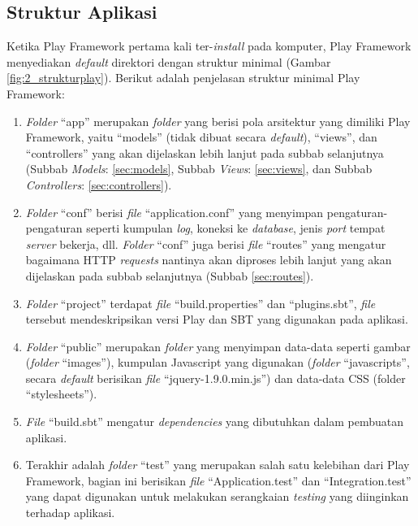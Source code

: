 \subsection{Struktur Aplikasi}
\label{sec:struktur_aplikasi}
Ketika Play Framework pertama kali ter-\textit{install} pada komputer, Play Framework menyediakan \textit{default} direktori dengan struktur minimal (Gambar \ref{fig:2_strukturplay}). Berikut adalah penjelasan struktur minimal Play Framework:
\begin{enumerate}
	\item \textit{Folder} ``app'' merupakan \textit{folder} yang berisi pola arsitektur yang dimiliki Play Framework, yaitu ``models'' (tidak dibuat secara \textit{default}), ``views'', dan ``controllers'' yang akan dijelaskan lebih lanjut pada subbab selanjutnya (Subbab \textit{Models}: \ref{sec:models}, Subbab \textit{Views}: \ref{sec:views}, dan Subbab \textit{Controllers}: \ref{sec:controllers}).
	\item \textit{Folder} ``conf'' berisi \textit{file} ``application.conf'' yang menyimpan pengaturan-pengaturan seperti kumpulan \textit{log}, koneksi ke \textit{database}, jenis \textit{port} tempat \textit{server} bekerja, dll. \textit{Folder} ``conf'' juga berisi \textit{file} ``routes'' yang mengatur bagaimana HTTP \textit{requests} nantinya akan diproses lebih lanjut yang akan dijelaskan pada subbab selanjutnya (Subbab \ref{sec:routes}).
	\item \textit{Folder} ``project'' terdapat \textit{file} ``build.properties'' dan ``plugins.sbt'', \textit{file} tersebut mendeskripsikan versi Play dan SBT yang digunakan pada aplikasi.
	\item \textit{Folder} ``public'' merupakan \textit{folder} yang menyimpan data-data seperti gambar (\textit{folder} ``images''), kumpulan Javascript yang digunakan (\textit{folder} ``javascripts'', secara \textit{default} berisikan \textit{file} ``jquery-1.9.0.min.js'') dan data-data CSS (folder ``stylesheets'').
	\item \textit{File} ``build.sbt'' mengatur \textit{dependencies} yang dibutuhkan dalam pembuatan aplikasi.
	\item Terakhir adalah \textit{folder} ``test'' yang merupakan salah satu kelebihan dari Play Framework, bagian ini berisikan \textit{file} ``Application.test'' dan ``Integration.test'' yang dapat digunakan untuk melakukan serangkaian \textit{testing} yang diinginkan terhadap aplikasi.
\end{enumerate}
     

